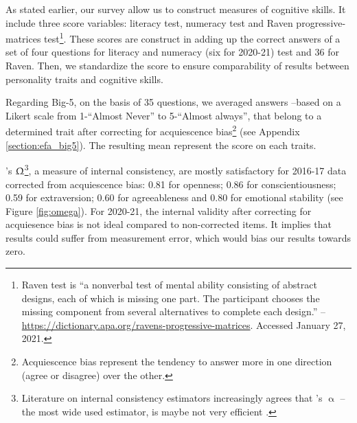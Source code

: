 \documentclass[a4paper, 11pt, onecolumn]{article}
\begin{document}
As stated earlier, our survey allow us to construct measures of cognitive skills.
It include three score variables: literacy test, numeracy test and Raven progressive-matrices test\footnote{Raven test is ``a nonverbal test of mental ability consisting of abstract designs, each of which is missing one part. The participant chooses the missing component from several alternatives to complete each design.'' -- \url{https://dictionary.apa.org/ravens-progressive-matrices}. Accessed January 27, 2021.}.
These scores are construct in adding up the correct answers of a set of four questions for literacy and numeracy (six for 2020-21) test and 36 for Raven.
Then, we standardize the score to ensure comparability of results between personality traits and cognitive skills.

Regarding Big-5, on the basis of 35 questions, we averaged answers --based on a Likert scale from 1-``Almost Never'' to 5-``Almost always'', that belong to a determined trait after correcting for acquiescence bias\footnote{Acquiescence bias represent the tendency to answer more in one direction (agree or disagree) over the other.} (see Appendix \ref{section:efa_big5}).
The resulting mean represent the score on each traits.

\citeauthor{McDonald1999}'s $\Upomega$\footnote{Literature on internal consistency estimators increasingly agrees that \citeauthor{Cronbach1951}'s $\upalpha$ --the most wide used estimator, is maybe not very efficient \citep{Bourque2019, TrizanoHermosilla2016}.}, a measure of internal consistency, are mostly satisfactory for 2016-17 data corrected from acquiescence bias: 0.81 for openness; 0.86 for conscientiousness; 0.59 for extraversion; 0.60 for agreeableness and 0.80 for emotional stability (see Figure \ref{fig:omega}).
For 2020-21, the internal validity after correcting for acquiesence bias is not ideal compared to non-corrected items.
It implies that results could suffer from measurement error, which would bias our results towards zero.
\end{document}
